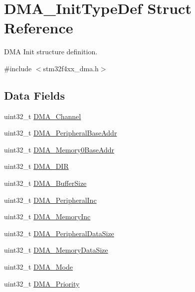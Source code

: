 \hypertarget{struct_d_m_a___init_type_def}{\section{D\-M\-A\-\_\-\-Init\-Type\-Def Struct Reference}
\label{struct_d_m_a___init_type_def}
}


D\-M\-A Init structure definition.  




{\ttfamily \#include $<$stm32f4xx\-\_\-dma.\-h$>$}

\subsection*{Data Fields}
\begin{DoxyCompactItemize}
\item 
uint32\-\_\-t \hyperlink{struct_d_m_a___init_type_def_afae070f2d49543b1acd3e318c6de8527}{D\-M\-A\-\_\-\-Channel}
\item 
uint32\-\_\-t \hyperlink{struct_d_m_a___init_type_def_ad02abd574cca0caeacd0cc05d2174a42}{D\-M\-A\-\_\-\-Peripheral\-Base\-Addr}
\item 
uint32\-\_\-t \hyperlink{struct_d_m_a___init_type_def_aebf1267410908265f83a8037245c337e}{D\-M\-A\-\_\-\-Memory0\-Base\-Addr}
\item 
uint32\-\_\-t \hyperlink{struct_d_m_a___init_type_def_a4cf4283185065f65d5a63089877cbb8d}{D\-M\-A\-\_\-\-D\-I\-R}
\item 
uint32\-\_\-t \hyperlink{struct_d_m_a___init_type_def_ad5e4b9069a7a145b3312d54d09059f78}{D\-M\-A\-\_\-\-Buffer\-Size}
\item 
uint32\-\_\-t \hyperlink{struct_d_m_a___init_type_def_ad0bf5e8b3968eaf8dc18e923b94acfe1}{D\-M\-A\-\_\-\-Peripheral\-Inc}
\item 
uint32\-\_\-t \hyperlink{struct_d_m_a___init_type_def_ad8f8a0f3ba4db5d79fd78d02093e4eb9}{D\-M\-A\-\_\-\-Memory\-Inc}
\item 
uint32\-\_\-t \hyperlink{struct_d_m_a___init_type_def_a61bf939d8657d44a9beb1daa91c14668}{D\-M\-A\-\_\-\-Peripheral\-Data\-Size}
\item 
uint32\-\_\-t \hyperlink{struct_d_m_a___init_type_def_a7ec1648d136d31d6c504565bf6949eb6}{D\-M\-A\-\_\-\-Memory\-Data\-Size}
\item 
uint32\-\_\-t \hyperlink{struct_d_m_a___init_type_def_a5f09c16a03a50120c1a1a49ae6a7c667}{D\-M\-A\-\_\-\-Mode}
\item 
uint32\-\_\-t \hyperlink{struct_d_m_a___init_type_def_aabb62e3f5536fc15a201058a1b6bda18}{D\-M\-A\-\_\-\-Priority}

\end{DoxyCompactItemize}
